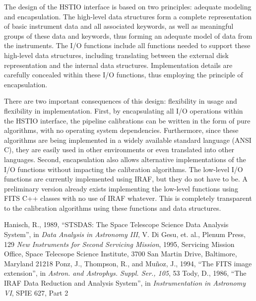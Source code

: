 The design of the HSTIO interface is based on two principles: adequate
modeling and encapsulation.  The high-level data structures form a
complete representation of basic instrument data and all associated
keywords, as well as meaningful groups of these data and keywords, thus
forming an adequate model of data from the instruments.  The I/O
functions include all functions needed to support these high-level data
structures, including translating between the external disk
representation and the internal data structures.  Implementation details
are carefully concealed within these I/O functions, thus employing the
principle of encapsulation. 

There are two important consequences of this design: flexibility in
usage and flexibility in implementation.  First, by encapsulating all
I/O operations within the HSTIO interface, the pipeline calibrations can
be written in the form of pure algorithms, with no operating system
dependencies.  Furthermore, since these algorithms are being implemented
in a widely available standard language (ANSI C), they are easily used
in other environments or even translated into other languages. 
Second, encapsulation also allows alternative implementations of the I/O
functions without impacting the calibration algorithms.  The low-level
I/O functions are currently implemented using IRAF, but they do not have
to be.  A preliminary version already exists implementing the low-level
functions using FITS C++ classes with no use of IRAF whatever.  This is
completely transparent to the calibration algorithms using these
functions and data structures. 



\begin{thebibliography}{99}
 { Hanisch, R., 1989, ``STSDAS: The Space Telescope Science Data
      Analysis System'', in {\em Data Analysis in Astronomy III}, 
      V. Di Gesu, et. al., Plenum Press, 129
}
 { {\em New Instruments for Second Servicing Mission}, 1995,
	Servicing Mission Office, Space Telecsope Science Institute,
	3700 San Martin Drive, Baltimore, Maryland 21218
}
 { Ponz, J., Thompson, R., and Mu\~{n}oz, J., 1994,
	``The FITS image extension'', in {\em Astron. and Astrophys. 
	Suppl. Ser., 105}, 53
}
 { Tody, D., 1986, ``The IRAF Data Reduction and Analysis System'', in
      {\em Instrumentation in Astronomy VI}, SPIE 627, Part 2
}
\end{thebibliography}



